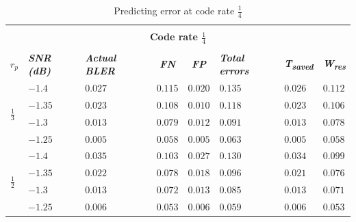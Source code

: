 \documentclass[conference]{IEEEtran}
\begin{document}
\begin{table}[htbp]
\caption{Predicting error at code rate $\frac{1}{4}$}
\begin{center}
\begin{tabular}{ |p{0.5em}|p{2.5em}|p{2em}|c|c|p{2.5em}|p{2.5em}|p{3em}|}
 \hline
 \multicolumn{8}{|c|}{} \\[-1em]
 \multicolumn{8}{|c|}{\textbf{Code rate $\frac{1}{4}$}} \\
 \multicolumn{8}{|c|}{} \\[-1em]
 \hline
\textbf{\textit{$r_{p}$}} & \textbf{\textit{SNR (dB)}} &\textbf{\textit{Actual BLER}} &\textbf{\textit{FN}} &\textbf{\textit{FP}} &\textbf{\textit{Total errors}}&\textbf{\textit{T\textsubscript{saved}}}&\textbf{\textit{W\textsubscript{res}}} \\
 \hline
 \multirow{4}{1em}{\centering $\frac{1}{3}$} & $-1.4$ &$0.027$ &$0.115$ &$0.020$ &$0.135$&$0.026$&$0.112$  \\\cline{2-8}
 & $-1.35$ &$0.023$ &$0.108$ &$0.010$ &$0.118$&$0.023$&$0.106$  \\\cline{2-8}
& $-1.3$ &$0.013$ &$0.079$ &$0.012$ &$0.091$&$0.013$&$0.078$  \\\cline{2-8}
& $-1.25$ &$0.005$ &$0.058$ &$0.005$ &$0.063$&$0.005$&$0.058$  \\\cline{2-8}
 \hline
 \multirow{4}{1em}{\centering $\frac{1}{2}$} & $-1.4$ &$0.035$ &$0.103$ &$0.027$ &$0.130$&$0.034$&$0.099$ \\\cline{2-8}
& $-1.35$ &$0.022$ &$0.078$ &$0.018$ &$0.096$&$0.021$&$0.076$ \\\cline{2-8}
& $-1.3$ &$0.013$ &$0.072$ &$0.013$ &$0.085$&$0.013$&$0.071$ \\\cline{2-8}
& $-1.25$ &$0.006$ &$0.053$ &$0.006$ &$0.059$&$0.006$&$0.053$ \\\cline{2-8}
 \hline
\end{tabular}
\label{tab1}
\end{center}
\end{table}

\end{document}
